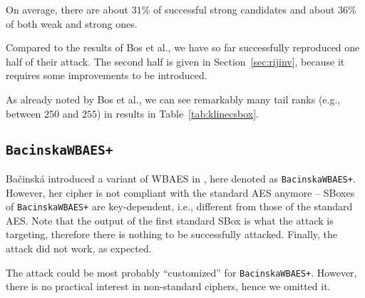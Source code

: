 	On average, there are about $31\%$ of successful strong candidates and about $36\%$ of both weak and strong ones.
	
	Compared to the results of Bos et al., we have so far successfully reproduced one half of their attack. The second half is given in Section~\ref{sec:rijinv}, because it requires some improvements to be introduced.
	
	\begin{note}
	\label{note:tailrank}
		As already noted by Bos et al., we can see remarkably many tail ranks (e.g., between $250$ and $255$) in results in Table~\ref{tab:klinecsbox}.
	\end{note}



\subsection{\tt BacinskaWBAES+}
\label{sec:bacinskawbaes}

Bačinská introduced a variant of WBAES in \cite{bacinska2015white}, here denoted as {\tt BacinskaWBAES+}. However, her cipher is not compliant with the standard AES anymore -- SBoxes of {\tt BacinskaWBAES+} are key-dependent, i.e., different from those of the standard AES. Note that the output of the first standard SBox is what the attack is targeting, therefore there is nothing to be successfully attacked. Finally, the attack did not work, as expected.

The attack could be most probably ``customized'' for {\tt BacinskaWBAES+}. However, there is no practical interest in non-standard ciphers, hence we omitted it.
